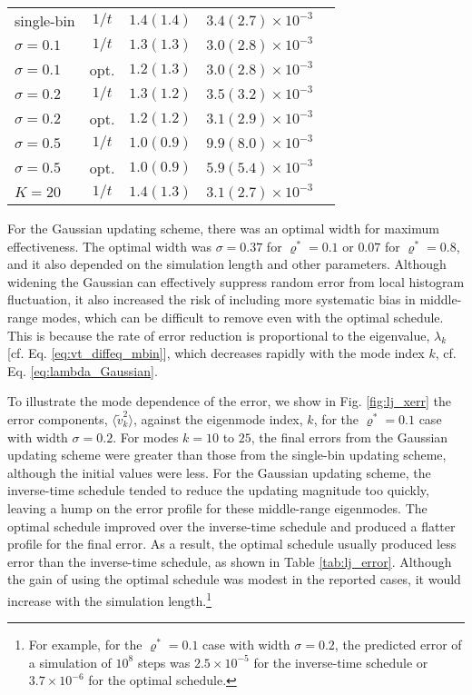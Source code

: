 \documentclass[preprint, superscriptaddress, floatfix]{revtex4-1}
\begin{document}
\begin{table}[h]
\begin{tabular} { l c c c c }
    \hline
    single-bin & $1/t$
    & $1.4(1.4)$
    & $3.4(2.7)\times10^{-3}$
    \\
    $\sigma=0.1$ & $1/t$
    & $1.3(1.3)$
    & $3.0(2.8)\times10^{-3}$
    \\
    $\sigma=0.1$ & opt.
    & $1.2(1.3)$
    & $3.0(2.8)\times10^{-3}$
    \\
    $\sigma=0.2$ & $1/t$
    & $1.3(1.2)$
    & $3.5(3.2)\times10^{-3}$
    \\
    $\sigma=0.2$ & opt.
    & $1.2(1.2)$
    & $3.1(2.9)\times10^{-3}$
    \\
    $\sigma=0.5$ & $1/t$
    & $1.0(0.9)$
    & $9.9(8.0)\times10^{-3}$
    \\
    $\sigma=0.5$ & opt.
    & $1.0(0.9)$
    & $5.9(5.4)\times10^{-3}$
    \\
    $K=20$ & $1/t$
    & $1.4(1.3)$
    & $3.1(2.7)\times10^{-3}$
    \\
    \hline
  \end{tabular}
\end{table}

For the Gaussian updating scheme,
there was an optimal width for maximum effectiveness.
%
The optimal width was $\sigma = 0.37$ for $\varrho^* = 0.1$
or $0.07$ for $\varrho^* = 0.8$,
and it also depended on the simulation length
and other parameters.
%
Although widening the Gaussian can
effectively suppress random error
from local histogram fluctuation,
it also increased the risk of including
more systematic bias in middle-range modes,
which can be difficult to remove
even with the optimal schedule.
%
This is because the rate of error reduction
is proportional to the eigenvalue, $\lambda_k$
[cf. Eq. \eqref{eq:vt_diffeq_mbin}],
which decreases rapidly with the mode index $k$,
cf. Eq. \eqref{eq:lambda_Gaussian}.

To illustrate the mode dependence of the error,
we show in Fig. \ref{fig:lj_xerr}
the error components, $\langle \tilde v_k^2 \rangle$,
against the eigenmode index, $k$,
for the $\varrho^* = 0.1$ case
with width $\sigma = 0.2$.
%
For modes $k=10$ to $25$,
the final errors from the Gaussian updating scheme
were greater than those from the single-bin updating scheme,
although the initial values were less.
%
For the Gaussian updating scheme,
the inverse-time schedule tended to
reduce the updating magnitude too quickly,
leaving a hump on the error profile
for these middle-range eigenmodes.
%
The optimal schedule improved over the inverse-time schedule
and produced a flatter profile for the final error.
%
As a result, the optimal schedule usually produced
less error than the inverse-time schedule,
as shown in Table \ref{tab:lj_error}.
%
Although the gain of using the optimal schedule
was modest in the reported cases,
it would increase with the simulation length.\footnote{
  For example, for the $\varrho^* = 0.1$ case
  with width $\sigma = 0.2$,
  the predicted error of a simulation of $10^8$ steps
  was $2.5\times10^{-5}$ for the inverse-time schedule
  or $3.7\times10^{-6}$ for the optimal schedule.}
\end{document}
